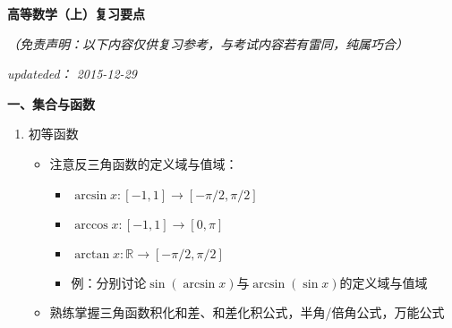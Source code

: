 \begin{center}
	{\bf \Large 高等数学（上）复习要点}
	
	\vspace{1em}
	
	{\it（免责声明：以下内容仅供复习参考，与考试内容若有雷同，纯属巧合）}
	
	{\it updateded： 2015-12-29}
\end{center}

\setlength{\parindent}{-10pt}

{\bf 一、集合与函数}
\begin{enumerate}
  \item 初等函数
  \begin{itemize}
    \item 注意反三角函数的定义域与值域：
    \begin{itemize}
      \item $\arcsin x:[-1,1]\to[-\pi/2,\pi/2]$
      \item $\arccos x:[-1,1]\to[0,\pi]$
      \item $\arctan x:\mathbb{R}\to[-\pi/2,\pi/2]$
      \item 例：分别讨论$\sin(\arcsin x)$与$\arcsin(\sin x)$的定义域与值域
    \end{itemize}
    \item 熟练掌握三角函数积化和差、和差化积公式，半角/倍角公式，万能公式
  \end{itemize}

\end{enumerate}

